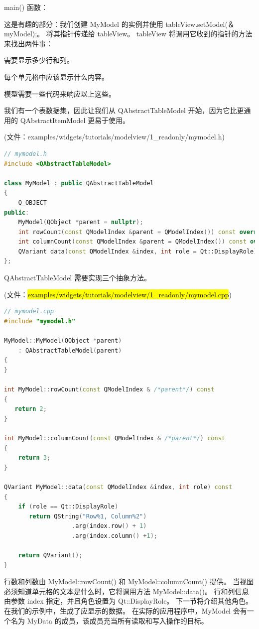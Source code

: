 main() 函数：

这是有趣的部分：我们创建 MyModel 的实例并使用 tableView.setModel(＆myModel);。 
将其指针传递给 tableView。 tableView 将调用它收到的指针的方法来找出两件事：

\begin{compactitem}[\arr]
\item 需要显示多少行和列。
\item 每个单元格中应该显示什么内容。
\end{compactitem}

模型需要一些代码来响应以上这些。

我们有一个表数据集，因此让我们从 QAbstractTableModel 开始，因为它比更通用的 QAbstractItemModel 更易于使用。

(文件：examples/widgets/tutorials/modelview/1\_readonly/mymodel.h)

\begin{lstlisting}[language=C++]
// mymodel.h
#include <QAbstractTableModel>
	
class MyModel : public QAbstractTableModel
{
	Q_OBJECT
public:
	MyModel(QObject *parent = nullptr);
	int rowCount(const QModelIndex &parent = QModelIndex()) const override;
	int columnCount(const QModelIndex &parent = QModelIndex()) const override;
	QVariant data(const QModelIndex &index, int role = Qt::DisplayRole) const override;
};
\end{lstlisting}

QAbstractTableModel 需要实现三个抽象方法。

(文件：\hl{examples/widgets/tutorials/modelview/1\_readonly/mymodel.cpp})

\begin{lstlisting}[language=C++]
	// mymodel.cpp
#include "mymodel.h"

MyModel::MyModel(QObject *parent)
    : QAbstractTableModel(parent)
{
}

int MyModel::rowCount(const QModelIndex & /*parent*/) const
{
   return 2;
}

int MyModel::columnCount(const QModelIndex & /*parent*/) const
{
    return 3;
}

QVariant MyModel::data(const QModelIndex &index, int role) const
{
    if (role == Qt::DisplayRole)
       return QString("Row%1, Column%2")
                   .arg(index.row() + 1)
                   .arg(index.column() +1);

    return QVariant();
}
\end{lstlisting}


行数和列数由 MyModel::rowCount() 和 MyModel::columnCount() 提供。
当视图必须知道单元格的文本是什么时，它将调用方法 MyModel::data()。
行和列信息由参数 index 指定，并且角色设置为 Qt::DisplayRole。
下一节将介绍其他角色。在我们的示例中，生成了应显示的数据。
在实际的应用程序中，MyModel 会有一个名为 MyData 的成员，该成员充当所有读取和写入操作的目标。


